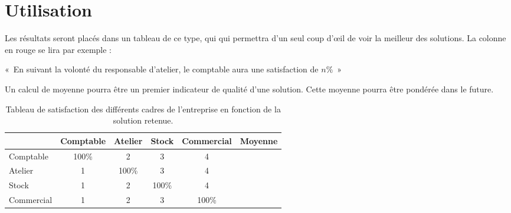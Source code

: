 \section{Utilisation}
Les résultats seront placés dans un tableau de ce type, qui qui permettra d'un
seul coup d'œil de voir la meilleur des solutions.
La colonne en rouge se lira par exemple : 
\begin{center}
«~En suivant la volonté du responsable d'atelier, le comptable aura une
satisfaction de $n\%$~»
\end{center}

Un calcul de moyenne pourra être un premier indicateur de qualité d'une
solution. Cette moyenne pourra être pondérée dans le future.

\begin{table}[h!]
    \begin{center}
    \begin{tabular}{|l|c|c|c|c|c|}
	\hline
	\cellcolor[gray]{0.9} & Comptable& Atelier & Stock & Commercial &
	Moyenne\\
	\hline
	Comptable & \cellcolor[gray]{0.9} 100\% & 2 & 3 & 4 & \\
	\hline
	Atelier & \cellcolor{red}1 & \cellcolor[gray]{0.9} 100\%  & 3 & 4 & \\
	\hline
	Stock & 1 & 2 & \cellcolor[gray]{0.9} 100\%  & 4 & \\
	\hline 
	Commercial & 1 & 2 & 3 & \cellcolor[gray]{0.9} 100\% & \\
	\hline
    \end{tabular}
    \end{center}
    \caption{Tableau de satisfaction des différents cadres de l'entreprise en
	fonction de la solution retenue.}
\end{table}


\begin{comment}
\begin{tabular}{|l||c|c|c|c||c|c|c|c||c|c|c|c||c|c|c|c|}
\hline
~ & \multicolumn{4}{|c||}{Comptable}
  & \multicolumn{4}{|c||}{Atelier}
  & \multicolumn{4}{|c||}{Stock}
  & \multicolumn{4}{|c|}{Commercial} \\
  \hline
Comptable & 1 & 2 & 3 & 4
	  & 1 & 2 & 3 & 4 
	  & 1 & 2 & 3 & 4
	  & 1 & 2 & 3 & 4 \\
\hline
Atelier & 1 & 2 & 3 & 4
	  & 1 & 2 & 3 & 4 
	  & 1 & 2 & 3 & 4
	  & 1 & 2 & 3 & 4 \\
\hline
Stock & 1 & 2 & 3 & 4
      & 1 & 2 & 3 & 4 
      & 1 & 2 & 3 & 4
      & 1 & 2 & 3 & 4 \\
\hline 
Commercial & 1 & 2 & 3 & 4
	   & 1 & 2 & 3 & 4 
	   & 1 & 2 & 3 & 4
	   & 1 & 2 & 3 & 4 \\
\hline


\end{tabular}
\end{comment}
